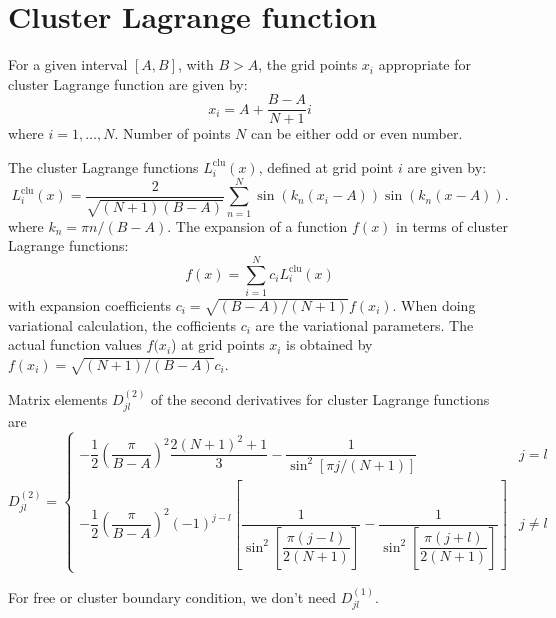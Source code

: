 \section{Cluster Lagrange function}

For a given interval $[A,B]$, with $B>A$, the grid points $x_{i}$
appropriate for cluster Lagrange function are given by:
\[
x_{i}=A+\frac{B-A}{N+1}i
\]
where $i=1,\ldots,N$. Number of points $N$ can be either odd or
even number.

The cluster Lagrange functions $L_{i}^{\mathrm{clu}}(x)$, defined
at grid point $i$ are given by:
\begin{equation}
L_{i}^{\mathrm{clu}}(x)=\frac{2}{\sqrt{(N+1)(B-A)}}\sum_{n=1}^{N}\sin\left(k_{n}(x_{i}-A)\right)\sin\left(k_{n}(x-A)\right).
\end{equation}
where $k_{n}=\pi n/(B-A)$. The expansion of a function $f(x)$ in
terms of cluster Lagrange functions:
\begin{equation}
f(x)=\sum_{i=1}^{N}c_{i}L_{i}^{\mathrm{clu}}(x)
\end{equation}
with expansion coefficients $c_{i}=\sqrt{(B-A)/(N+1)}f(x_{i})$. When
doing variational calculation, the cofficients $c_{i}$ are the variational
parameters. The actual function values $f(x_{i}$) at grid points
$x_{i}$ is obtained by $f(x_{i})=\sqrt{(N+1)/(B-A)}c_{i}$.

Matrix elements $D_{jl}^{(2)}$ of the second derivatives for cluster
Lagrange functions are
\begin{equation}
D_{jl}^{(2)}=\begin{cases}
-\dfrac{1}{2}\left(\dfrac{\pi}{B-A}\right)^{2}\dfrac{2(N+1)^{2}+1}{3}-\dfrac{1}{\sin^{2}\left[\pi j/(N+1)\right]} & j=l\\
-\dfrac{1}{2}\left(\dfrac{\pi}{B-A}\right)^{2}(-1)^{j-l}\left[\dfrac{1}{\sin^{2}\left[\dfrac{\pi(j-l)}{2(N+1)}\right]}-\dfrac{1}{\sin^{2}\left[\dfrac{\pi(j+l)}{2(N+1)}\right]}\right] & j\neq l
\end{cases}
\end{equation}

For free or cluster boundary condition, we don't need $D_{jl}^{(1)}$.
